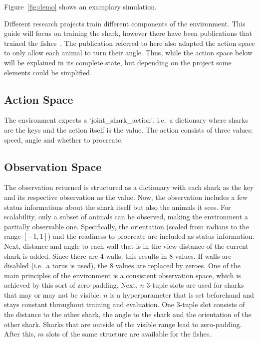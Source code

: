 \documentclass[12pt, letterpaper, fleqn, notitlepage]{article}
\begin{document}
Figure~\ref{fig:demo} shows an examplary simulation.

Different research projects train different components of the environment. This
guide will focus on training the shark, however there have been publications
that trained the fishes~\cite{HPGBL19}. The publication referred to here also
adapted the action space to only allow each animal to turn their angle. Thus,
while the action space below will be explained in its complete state, but
depending on the project some elements could be simplified.

\subsection{Action Space}

The environment expects a `joint\_shark\_action', i.e.\ a dictionary where
sharks are the keys and the action itself is the value. The action consists of
three values: speed, angle and whether to procreate.

\subsection{Observation Space}

The observation returned is structured as a dictionary with each shark as the
key and its respective observation as the value. Now, the observation includes
a few status informations about the shark itself but also the animals it sees.
For scalability, only a subset of animals can be observed, making the
environment a partially observable one. Specifically, the orientation (scaled
from radians to the range $[-1, 1]$) and the readiness to procreate are
included as status information. Next, distance and angle to each wall that is
in the view distance of the current shark is added. Since there are 4 walls,
this results in 8 values. If walls are disabled (i.e.\ a torus is used), the 8
values are replaced by zeroes. One of the main principles of the environment is
a consistent observation space, which is achieved by this sort of zero-padding.
Next, $n$ 3-tuple slots are used for sharks that may or may not be visible. $n$
is a hyperparameter that is set beforehand and stays constant throughout
training and evaluation. One 3-tuple slot consists of the distance to the other
shark, the angle to the shark and the orientation of the other shark. Sharks
that are outside of the visible range lead to zero-padding. After this, $m$
slots of the same structure are available for the fishes.
\end{document}
